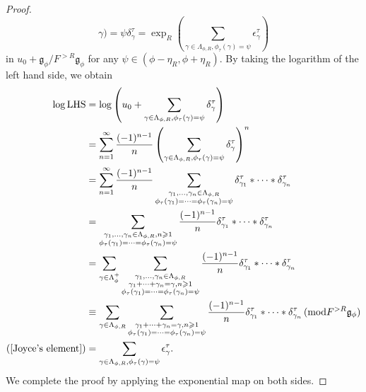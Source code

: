 \documentclass[a4paper,12pt]{amsart}
\numberwithin{equation}{section}
\newcommand{\mmod}{\mathrm{mod}}
\newcommand{\1}{\mathbf{1}}
\newcommand{\LHS}{\mathrm{LHS}}
\begin{document}
\begin{proof}
\[{    \gamma)=\psi}\delta^\tau_\gamma=\exp_R\left(\sum_{\gamma\in\Lambda_{\phi,R},\phi_\tau(\gamma)=\psi}\epsilon^\tau_\gamma\right)\]
    in $u_0+\mathfrak{g}_\phi/F^{>R}\mathfrak{g}_\phi$ for any $\psi\in(\phi-\eta_R,\phi+\eta_R)$. By taking the logarithm of the left hand side, we obtain
    \begin{align*}
        \log\LHS&=\log\left(u_0+\sum_{\gamma\in\Lambda_{\phi,R},\phi_\tau(
    \gamma)=\psi}\delta^\tau_\gamma\right)\\
    &=\sum_{n=1}^\infty\dfrac{(-1)^{n-1}}{n}\left(\sum_{\gamma\in\Lambda_{\phi,R},\phi_\tau(
    \gamma)=\psi}\delta^\tau_\gamma\right)^n\\
    &=\sum_{n=1}^\infty\dfrac{(-1)^{n-1}}{n}\sum_{\begin{subarray}{c}
        \gamma_1,\dots,\gamma_n\in\Lambda_{\phi,R}\\
        \phi_\tau(\gamma_1)=\dots=\phi_\tau(\gamma_n)=\psi
    \end{subarray}}\delta^\tau_{\gamma_1}*\dots*\delta^\tau_{\gamma_n}\\
    &=\sum_{\begin{subarray}{c}
        \gamma_1,\dots,\gamma_n\in\Lambda_{\phi,R},n\geqslant1\\
        \phi_\tau(\gamma_1)=\dots=\phi_\tau(\gamma_n)=\psi
    \end{subarray}}\dfrac{(-1)^{n-1}}{n}\delta^\tau_{\gamma_1}*\dots*\delta^\tau_{\gamma_n}\\
    &=\sum_{\gamma\in\Lambda_\phi^+}\sum_{\begin{subarray}{c}
        \gamma_1,\dots,\gamma_n\in\Lambda_{\phi,R}\\
        \gamma_1+\dots+\gamma_n=\gamma,n\geqslant1\\
        \phi_\tau(\gamma_1)=\dots=\phi_\tau(\gamma_n)=\psi
    \end{subarray}}\dfrac{(-1)^{n-1}}{n}\delta^\tau_{\gamma_1}*\dots*\delta^\tau_{\gamma_n}\\
    &\equiv\sum_{\gamma\in\Lambda_{\phi,R}}\sum_{\begin{subarray}{c}
        \gamma_1+\dots+\gamma_n=\gamma,n\geqslant1\\
        \phi_\tau(\gamma_1)=\dots=\phi_\tau(\gamma_n)=\psi
    \end{subarray}}\dfrac{(-1)^{n-1}}{n}\delta^\tau_{\gamma_1}*\dots*\delta^\tau_{\gamma_n}\,(\mmod F^{>R}\mathfrak{g}_\phi)\\
    (\ref{Joyce's element})&=\sum_{\gamma\in\Lambda_{\phi,R},\phi_\tau(\gamma)=\psi}\epsilon^\tau_\gamma.
    \end{align*}
    We complete the proof by applying the exponential map on both sides.
\end{proof}
\end{document}
